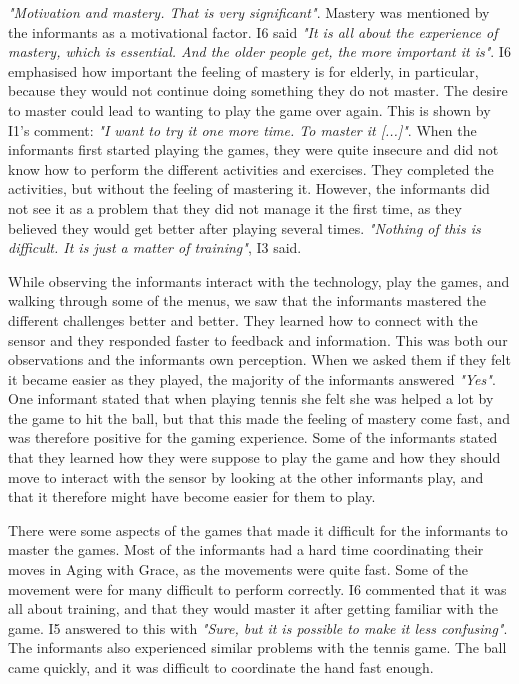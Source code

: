 \emph{"Motivation and mastery. That is very significant"}. Mastery was mentioned by the informants as a motivational factor. I6 said \emph{"It is all about the experience of mastery, which is essential. And the older people get, the more important it is"}. I6 emphasised how important the feeling of mastery is for elderly, in particular, because they would not continue doing something they do not master. The desire to master could lead to wanting to play the game over again. This is shown by I1's comment: \emph{"I want to try it one more time. To master it [...]"}. When the informants first started playing the games, they were quite insecure and did not know how to perform the different activities and exercises. They completed the activities, but without the feeling of mastering it. However, the informants did not see it as a problem that they did not manage it the first time, as they believed they would get better after playing several times. \emph{"Nothing of this is difficult. It is just a matter of training"}, I3 said. 

While observing the informants interact with the technology, play the games, and walking through some of the menus, we saw that the informants mastered the different challenges better and better. They learned how to connect with the sensor and they responded faster to feedback and information. This was both our observations and the informants own perception. When we asked them if they felt it became easier as they played, the majority of the informants answered \emph{"Yes"}. One informant stated that when playing tennis she felt she was helped a lot by the game to hit the ball, but that this made the feeling of mastery come fast, and was therefore positive for the gaming experience. Some of the informants stated that they learned how they were suppose to play the game and how they should move to interact with the sensor by looking at the other informants play, and that it therefore might have become easier for them to play. 

There were some aspects of the games that made it difficult for the informants to master the games. Most of the informants had a hard time coordinating their moves in Aging with Grace, as the movements were quite fast. Some of the movement were for many difficult to perform correctly. I6 commented that it was all about training, and that they would master it after getting familiar with the game. I5 answered to this with \emph{"Sure, but it is possible to make it less confusing"}. The informants also experienced similar problems with the tennis game. The ball came quickly, and it was difficult to coordinate the hand fast enough. 

